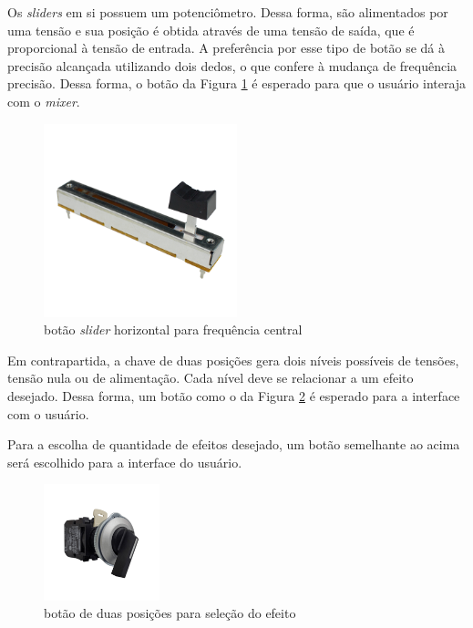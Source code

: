 Os \textit{sliders} em si possuem um potenciômetro. Dessa forma, são alimentados por uma tensão e sua posição é obtida através de uma tensão de saída, que é proporcional à tensão de entrada. A preferência por esse tipo de botão se dá à precisão alcançada utilizando dois dedos, o que confere à mudança de frequência precisão. Dessa forma, o botão da Figura \ref{fig61} é esperado para que o usuário interaja com o \textit{mixer}. 

\begin{figure}[h]
    \centering
    \includegraphics[width=0.5\textwidth]{figuras/fig61.png}
    \caption{botão \textit{slider} horizontal para frequência central \cite{robocore}}
    \label{fig61}
\end{figure}

Em contrapartida, a chave de duas posições gera dois níveis possíveis de tensões, tensão nula ou de alimentação. Cada nível deve se relacionar a um efeito desejado. Dessa forma, um botão como o da Figura \ref{fig62} é esperado para a interface com o usuário.

Para a escolha de quantidade de efeitos desejado, um botão semelhante ao acima será escolhido para a interface do usuário.

\begin{figure}[h]
    \centering
    \includegraphics[width=0.3\textwidth]{figuras/fig62.png}
    \caption{botão de duas posições para seleção do efeito \cite{evea}}
    \label{fig62}
\end{figure}

